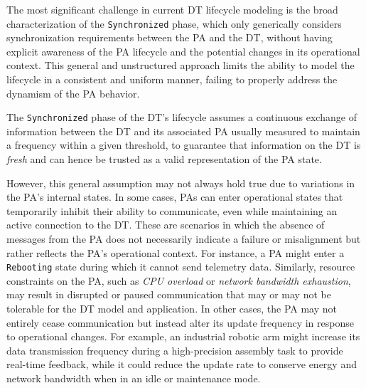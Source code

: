 The most significant challenge in current \ac{DT} lifecycle modeling is the broad characterization of the \texttt{Synchronized} phase, which
only generically considers synchronization requirements between the \ac{PA} and the \ac{DT}, without having explicit awareness of the \ac{PA} lifecycle and the potential changes in its operational context.
This general and unstructured approach limits the ability to model the lifecycle in a consistent and uniform manner, failing to properly address the dynamism of the \ac{PA} behavior.

The \texttt{Synchronized} phase of the \ac{DT}'s lifecycle assumes a continuous exchange of information between the \ac{DT} and its associated \ac{PA} usually measured to maintain a frequency within a given threshold, to guarantee that information on the \ac{DT} is \emph{fresh} and can hence be trusted as a valid representation of the \ac{PA} state. 

However, this general assumption may not always hold true due to variations in the \ac{PA}'s internal states.
%
In some cases, \acp{PA} can enter operational states that temporarily inhibit their ability to communicate, even while maintaining an active connection to the \ac{DT}.
These are scenarios in which the absence of messages from the \ac{PA} does not necessarily indicate a failure or misalignment but rather reflects the \ac{PA}'s operational context.
For instance, a \ac{PA} might enter a \texttt{Rebooting} state during which it cannot send telemetry data.
Similarly, resource constraints on the \ac{PA}, such as \textit{CPU overload} or \textit{network bandwidth exhaustion}, may result in disrupted or paused communication that may or may not be tolerable for the \ac{DT} model and application.
%
In other cases, the \ac{PA} may not entirely cease communication but instead alter its update frequency in response to operational changes. For example, an industrial robotic arm might increase its data transmission frequency during a high-precision assembly task to provide real-time feedback, while it could reduce the update rate to conserve energy and network bandwidth when in an idle or maintenance mode.


